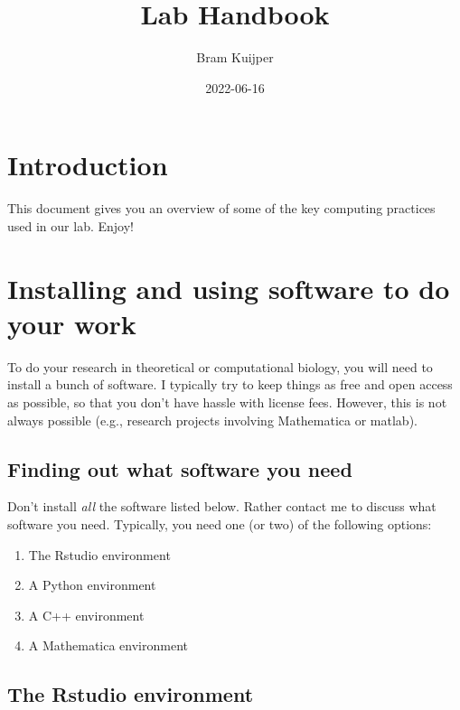 \documentclass[
]{book}
\title{Lab Handbook}
\author{Bram Kuijper}
\date{2022-06-16}
\providecommand{\tightlist}{%
  \setlength{\itemsep}{0pt}\setlength{\parskip}{0pt}}
\begin{document}
\maketitle

{
\setcounter{tocdepth}{1}
\tableofcontents
}
\hypertarget{introduction}{%
\chapter{Introduction}\label{introduction}}

This document gives you an overview of some of the key computing practices used in our lab. Enjoy!

\hypertarget{installing-and-using-software-to-do-your-work}{%
\chapter{Installing and using software to do your work}\label{installing-and-using-software-to-do-your-work}}

To do your research in theoretical or computational biology, you will need to install a bunch of software. I typically try to keep things as free and open access as possible, so that you don't have hassle with license fees. However, this is not always possible (e.g., research projects involving Mathematica or matlab).

\hypertarget{finding-out-what-software-you-need}{%
\section{Finding out what software you need}\label{finding-out-what-software-you-need}}

Don't install \emph{all} the software listed below. Rather contact me to discuss what software you need. Typically, you need one (or two) of the following options:

\begin{enumerate}
\def\labelenumi{\arabic{enumi}.}
\tightlist
\item
  The Rstudio environment
\item
  A Python environment
\item
  A C++ environment
\item
  A Mathematica environment
\end{enumerate}

\hypertarget{the-rstudio-environment}{%
\section{The Rstudio environment}\label{the-rstudio-environment}}
\end{document}
